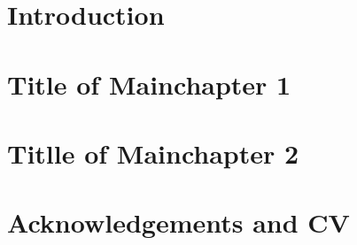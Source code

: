 \documentclass[a4paper,11pt]{memoir}
\begin{document}
\mainmatter

\vspace*{-0.15\textheight}
\tableofcontents
%
\chapter{Introduction}

%
%
\chapter{Title of Mainchapter 1}

\chapter{Titlle of Mainchapter 2}

%
%
\backmatter
\printbibliography
%
%
\chapter{Acknowledgements and CV}

%
%
\end{document}
